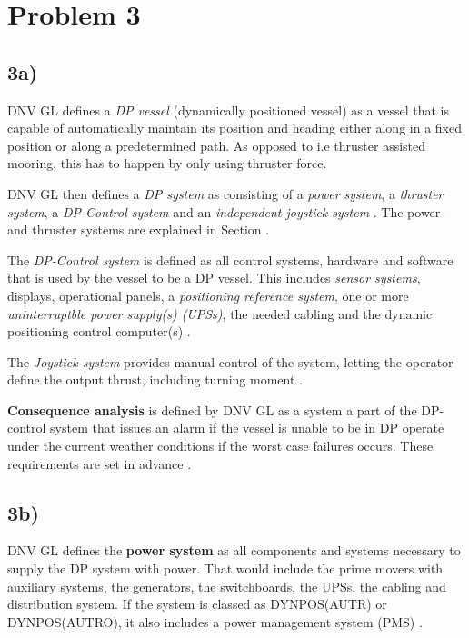 \section*{Problem 3}
\subsection*{3a)}
 \label{par:Def_DP_system}

DNV GL defines a \textit{DP vessel} (dynamically positioned vessel) as a vessel that is capable of automatically maintain its position and heading either along in a fixed position or along a predetermined path. As opposed to i.e thruster assisted mooring, this has to happen by only using thruster force\cite{RulesShipsDNVGLPart6Chap3}. 

DNV GL then defines a \textit{DP system} as consisting of a \textit{power system}, a \textit{thruster system}, a \textit{DP-Control system} and an \textit{independent joystick system} \cite{RulesShipsDNVGLPart6Chap3}. The power- and thruster systems are explained in Section . 

The \textit{DP-Control system} is defined as all control systems, hardware and software that is used by the vessel to be a DP vessel. This includes \textit{sensor systems}, displays, operational panels, a \textit{positioning reference system}, one or more \textit{uninterruptble power supply(s) (UPSs)}, the needed cabling and the dynamic positioning control computer(s) \cite{RulesShipsDNVGLPart6Chap3}.  

The \textit{Joystick system} provides manual control of the system, letting the operator define the output thrust, including turning moment \cite{RulesShipsDNVGLPart6Chap3}.  

\textbf{Consequence analysis} is defined by DNV GL as a system a part of the DP-control system that issues an alarm if the vessel is unable to be in DP operate under the current weather conditions if the worst case failures occurs. These requirements are set in advance \cite{RulesShipsDNVGLPart6Chap3}. 


\subsection*{3b)} \label{sec:3b}
DNV GL defines the \textbf{power system} as all components and systems necessary to supply the DP system with power. That would include the prime movers with auxiliary systems, the generators, the switchboards, the UPSs, the cabling and distribution system. If the system is classed as DYNPOS(AUTR) or DYNPOS(AUTRO), it also includes a power management system (PMS) \cite{RulesShipsDNVGLPart6Chap3}.  


